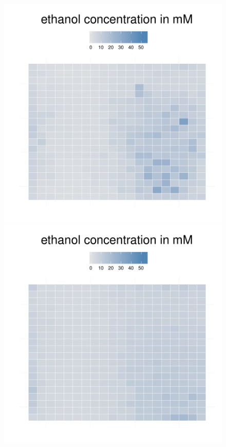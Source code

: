 \begin{figure}[h!]
{\begin{minipage}[t]{0.3\textwidth}
  \end{minipage}
  \begin{minipage}[t]{0.3\textwidth}
    \includegraphics[width=\textwidth]{../results/img/ecoli_beijerinckii_20x20_seed5147_eth55.pdf}
  \end{minipage}
  \begin{minipage}[t]{0.3\textwidth}
    \includegraphics[width=\textwidth]{../results/img/ecoli_beijerinckii_20x20_seed5147_eth65.pdf}

\end{minipage}}
\end{figure}

